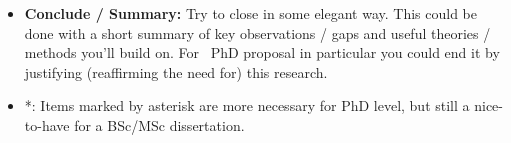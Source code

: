\begin{itemize}
  \item \textbf{Conclude / Summary:} Try to close in some elegant way.  This could be done with a short summary of key observations / gaps and useful theories / methods you'll build on. For \eg~PhD proposal in particular you could end it by justifying (reaffirming the need for) this research.
  
  \item *: Items marked by asterisk are more necessary for PhD level, but still a nice-to-have for a BSc/MSc dissertation.
\end{itemize}

